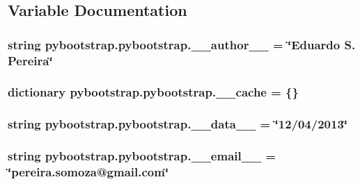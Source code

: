 \subsection{Variable Documentation}
\hypertarget{namespacepybootstrap_1_1pybootstrap_a886ce8078eb2440507c6a7191fc3ee29}{
\subsubsection[{\-\_\-\-\_\-author\-\_\-\-\_\-}]{\setlength{\rightskip}{0pt plus 5cm}string pybootstrap.\-pybootstrap.\-\_\-\-\_\-author\-\_\-\-\_\- = \char`\"{}Eduardo S. Pereira\char`\"{}}}\label{namespacepybootstrap_1_1pybootstrap_a886ce8078eb2440507c6a7191fc3ee29}
\hypertarget{namespacepybootstrap_1_1pybootstrap_a7b4c58608bd0e1bff0bd2d6ba1cb4c6d}{
\subsubsection[{\-\_\-\-\_\-cache}]{\setlength{\rightskip}{0pt plus 5cm}dictionary pybootstrap.\-pybootstrap.\-\_\-\-\_\-cache = \{\}}}\label{namespacepybootstrap_1_1pybootstrap_a7b4c58608bd0e1bff0bd2d6ba1cb4c6d}
\hypertarget{namespacepybootstrap_1_1pybootstrap_acabe7aec3f4f71c215cb9561622a987b}{
\subsubsection[{\-\_\-\-\_\-data\-\_\-\-\_\-}]{\setlength{\rightskip}{0pt plus 5cm}string pybootstrap.\-pybootstrap.\-\_\-\-\_\-data\-\_\-\-\_\- = \char`\"{}12/04/2013\char`\"{}}}\label{namespacepybootstrap_1_1pybootstrap_acabe7aec3f4f71c215cb9561622a987b}
\hypertarget{namespacepybootstrap_1_1pybootstrap_a7cb59c39808a56409218cdc677e86c8e}{
\subsubsection[{\-\_\-\-\_\-email\-\_\-\-\_\-}]{\setlength{\rightskip}{0pt plus 5cm}string pybootstrap.\-pybootstrap.\-\_\-\-\_\-email\-\_\-\-\_\- = \char`\"{}pereira.\-somoza@gmail.\-com\char`\"{}}}\label{namespacepybootstrap_1_1pybootstrap_a7cb59c39808a56409218cdc677e86c8e}
